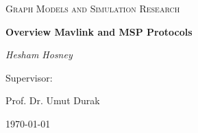\documentclass{report}
\begin{document}
\begin{titlepage}
	\centering
	{\scshape\LARGE  \par}
	\vspace{1cm}
	{\scshape\Large Graph Models and Simulation Research  \par}
	\vspace{1.5cm}
	{\huge\bfseries Overview Mavlink and MSP Protocols \par}
	\vspace{1cm}
	{\huge\itshape Hesham Hosney\par}
        \vspace{2cm} 
	{\Large Supervisor:\par } 
	{\huge Prof. Dr. Umut Durak\par}
\vspace{.5cm} 

\vfill
	{\large \today\par}
\end{titlepage}


\cleardoublepage
\tableofcontents
\listoffigures
\cleardoublepage



\begin{abstract}


In this report, we briefly describe Mavlink and MSP protocols our main aim is to provide structured documentation, which maps the relation between Mavlink and MSP common messages. we will start with an introductory chapter discussing the main flight stack and commonly used technology, an overview of Mavlink Protocol, and Multiwii Serial protocol.
chapter 2 we will focus on our main goal which is mapping the messages between the two protocols.
We conclude our findings the conculsion chapter.


\end{abstract}
%







\end{document}
